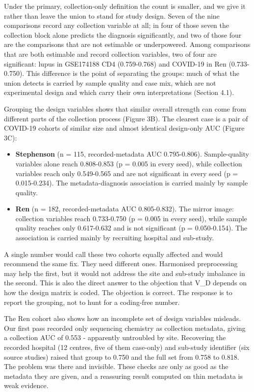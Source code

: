 Under the primary, collection-only definition the count is smaller, and we give it rather than leave the union to stand for study design. Seven of the nine comparisons record any collection variable at all; in four of those seven the collection block alone predicts the diagnosis significantly, and two of those four are the comparisons that are not estimable or underpowered. Among comparisons that are both estimable and record collection variables, two of four are significant: lupus in GSE174188 CD4 (0.759-0.768) and COVID-19 in Ren (0.733-0.750). This difference is the point of separating the groups: much of what the union detects is carried by sample quality and case mix, which are not experimental design and which carry their own interpretations (Section 4.1).

Grouping the design variables shows that similar overall strength can come from different parts of the collection process (Figure 3B). The clearest case is a pair of COVID-19 cohorts of similar size and almost identical design-only AUC (Figure 3C):

\begin{itemize}
\tightlist
\item
  \textbf{Stephenson} (n = 115, recorded-metadata AUC 0.795-0.806). Sample-quality variables alone reach 0.808-0.853 (p = 0.005 in every seed), while collection variables reach only 0.549-0.565 and are not significant in every seed (p = 0.015-0.234). The metadata-diagnosis association is carried mainly by sample quality.
\item
  \textbf{Ren} (n = 182, recorded-metadata AUC 0.805-0.832). The mirror image: collection variables reach 0.733-0.750 (p = 0.005 in every seed), while sample quality reaches only 0.617-0.632 and is not significant (p = 0.050-0.154). The association is carried mainly by recruiting hospital and sub-study.
\end{itemize}

A single number would call these two cohorts equally affected and would recommend the same fix. They need different ones. Harmonised preprocessing may help the first, but it would not address the site and sub-study imbalance in the second. This is also the direct answer to the objection that V\_D depends on how the design matrix is coded. The objection is correct. The response is to report the grouping, not to hunt for a coding-free number.

The Ren cohort also shows how an incomplete set of design variables misleads. Our first pass recorded only sequencing chemistry as collection metadata, giving a collection AUC of 0.553 - apparently untroubled by site. Recovering the recorded hospital (12 centres, five of them case-only) and sub-study identifier (six source studies) raised that group to 0.750 and the full set from 0.758 to 0.818. The problem was there and invisible. These checks are only as good as the metadata they are given, and a reassuring result computed on thin metadata is weak evidence.

